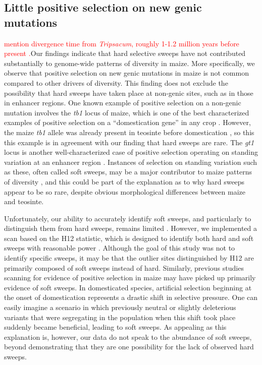 \documentclass{pnastwo}
\newcommand{\jri}[1]{\textcolor{red}{\scriptsize #1}}
\begin{document}
\begin{article}
\subsection{Little positive selection on new genic mutations}
\jri{mention divergence time from \emph{Tripsacum}, roughly 1-1.2 million years before present \cite{ross2009}.}Our findings indicate that hard selective sweeps have not contributed substantially to genome-wide patterns of diversity in maize. More specifically, we observe that positive selection on new genic mutations in maize is not common compared to other drivers of diversity. This finding does not exclude the possibility that hard sweeps have taken place at non-genic sites, such as in those in enhancer regions. One known example of positive selection on a non-genic mutation involves the \emph{tb1} locus of maize, which is one of the best characterized examples of positive selection on a ``domestication gene'' in any crop \cite{clark2006}. However, the maize \emph{tb1} allele was already present in teosinte before domestication \cite{studer2011}, so this this example is in agreement with our finding that hard sweeps are rare. The \emph{gt1} locus is another well-characterized case of positive selection operating on standing variation at an enhancer region \cite{wills2013}. Instances of selection on standing variation such as these, often called soft sweeps, may be a major contributor to maize patterns of diversity \cite{beissinger2014}, and this could be part of the explanation as to why hard sweeps appear to be so rare, despite obvious morphological differences between maize and teosinte.

Unfortunately, our ability to accurately identify soft sweeps, and particularly to distinguish them from hard sweeps, remains limited \cite{innan2004,messer2013}. However, we implemented a scan based on the H12 statistic, which is designed to identify both hard and soft sweeps with reasonable power \cite{garud2015}. Although the goal of this study was not to identify specific sweeps, it may be that the outlier sites distinguished by H12 are primarily composed of soft sweeps instead of hard. Similarly, previous studies scanning for evidence of positive selection in maize \cite{hufford2012} may have picked up primarily evidence of soft sweeps. In domesticated species, artificial selection beginning at the onset of domestication represents a drastic shift in selective pressure. One can easily imagine a scenario in which previously neutral or slightly deleterious variants that were segregating in the population when this shift took place suddenly became beneficial, leading to soft sweeps. As appealing as this explanation is, however, our data do not speak to the abundance of soft sweeps, beyond demonstrating that they are one possibility for the lack of observed hard sweeps.


\end{article}
\end{document}
